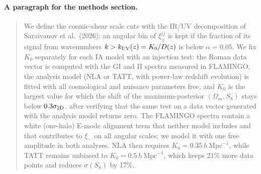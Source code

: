 \documentclass[11pt]{article}
\newcommand{\hmpc}{\,h\,\mathrm{Mpc}^{-1}}
\newcommand{\kuv}{k_{\rm UV}}
\begin{document}
\begin{table}[H]\centering\small
\caption{Recommended cut sets with the production covariance
\texttt{example1\_cov} ($\alpha = 0.05$; GGL with $s > l$, $K_0^{\rm ggl} =
K_0^{\rm gc} = 0.2$ throughout). FoB case A (case B in brackets);
$\sigma(S_8)$ case A. Gaussian-covariance numbers in Sec.~\ref{sec:C} to
\ref{sec:D}.}
\label{tab:rec}
\end{table}

\paragraph{A paragraph for the methods section.}
\begin{quote}\small
We define the cosmic-shear scale cuts with the IR/UV decomposition of
Saraivanov et al.\ (2026): an angular bin of $\xi_\pm^{ij}$ is kept if the
fraction of its signal from wavenumbers $k > \kuv(z) = K_0/D(z)$ is below
$\alpha = 0.05$. We fix $K_0$ separately for each IA model with an injection
test: the Roman data vector is computed with the GI and II spectra measured
in FLAMINGO, the analysis model (NLA or TATT, with power-law redshift
evolution) is fitted with all cosmological and nuisance parameters free, and
$K_0$ is the largest value for which the shift of the maximum-posterior
$(\Omega_m, S_8)$ stays below $0.3\sigma_{\rm 2D}$, after verifying that the
same test on a data vector generated with the analysis model returns zero.
The FLAMINGO spectra contain a white (one-halo) E-mode alignment term that
neither model includes and that contributes to $\xi_-$ on all angular scales;
we model it with one free amplitude in both analyses. NLA then requires $K_0
= 0.35\hmpc$, while TATT remains unbiased to $K_0 = 0.5\hmpc$, which keeps
21\% more data points and reduces $\sigma(S_8)$ by 17\%.
\end{quote}
\end{document}
